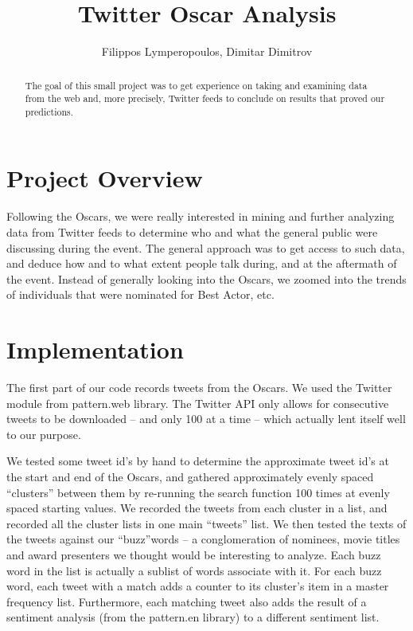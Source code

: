 \documentclass[11pt]{article}
\title{Twitter Oscar Analysis}
\author{Filippos Lymperopoulos, Dimitar Dimitrov}
\begin{document}
\maketitle
\vspace*{45 mm}
\begin{abstract}
The goal of this small project was to get experience on taking and examining data from the web and, more precisely, Twitter feeds to conclude on results that proved our predictions. 
\end{abstract}

\newpage

\section{Project Overview}
Following the Oscars, we were really interested in mining and further analyzing data from Twitter feeds to determine who and what the general public were discussing during the event. The general approach was to get access to such data, and deduce how and to what extent people talk during, and at the aftermath of the event. Instead of generally looking into the Oscars, we zoomed into the trends of individuals that were nominated for Best Actor, etc.

\section{Implementation}

The first part of our code records tweets from the Oscars. We used the Twitter module from pattern.web library. The Twitter API only allows for consecutive tweets to be downloaded – and only 100 at a time – which actually lent itself well to our purpose. 

We tested some tweet id's by hand to determine the approximate tweet id's at the start and end of the Oscars, and gathered approximately evenly spaced “clusters” between them by re-running the search function 100 times at evenly spaced starting values. We recorded the tweets from each cluster in a list, and recorded all the cluster lists in one main “tweets” list. We then tested the texts of the tweets against our “buzz”words – a conglomeration of nominees, movie titles and award presenters we thought would be interesting to analyze. Each buzz word in the list is actually a sublist of words associate with it. For each buzz word, each tweet with a match adds a counter to its cluster's item in a master frequency list. Furthermore, each matching tweet also adds the result of a sentiment analysis (from the pattern.en library) to a different sentiment list. 
\end{document}

